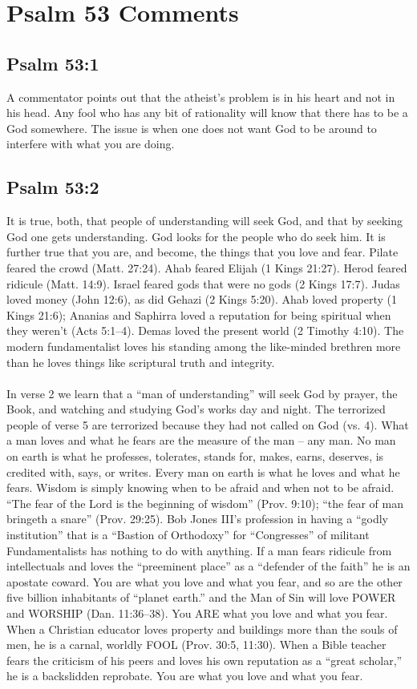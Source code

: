 \section{Psalm 53 Comments}

\subsection{Psalm 53:1}
A commentator points out that the atheist's problem is in his heart and not in his head. Any fool who has any bit of rationality will know that there has to be a God somewhere. The issue is when one does not want God to be around to interfere with what you are doing. \cite{Ruckman1992PsalmsV1}

\subsection{Psalm 53:2}
It is true, both, that people of understanding will seek God, and that by seeking God one gets understanding. God looks for the people who do seek him. It is further true that you are, and become, the things that you love and fear. Pilate feared the crowd (Matt. 27:24). Ahab feared Elijah (1 Kings 21:27). Herod feared ridicule (Matt. 14:9). Israel feared gods that were no gods (2 Kings 17:7). Judas loved money (John 12:6), as did Gehazi (2 Kings 5:20). Ahab loved property (1 Kings 21:6); Ananias and Saphirra loved a reputation for being spiritual when they weren't (Acts 5:1--4). Demas loved the present world (2 Timothy 4:10). The modern fundamentalist loves his standing among the like-minded brethren more than he loves things like scriptural truth and integrity. \cite{Ruckman1992PsalmsV1}\\
\\
\noindent In verse 2 we learn that a ``man of understanding'' will seek God by prayer, the Book, and watching and studying God’s works day and night. The terrorized people of verse 5 are terrorized because they had not called on God (vs. 4). What a man loves and what he fears are the measure of the man -- any man. No man on earth is what he professes, tolerates, stands for, makes, earns, deserves, is credited with, says, or writes. Every man on earth is what he loves and what he fears. Wisdom is simply knowing when to be afraid and when not to be afraid. ``The fear of the Lord is the beginning of wisdom'' (Prov. 9:10); ``the fear of man bringeth a snare'' (Prov. 29:25). Bob Jones III’s profession in having a ``godly institution'' that is a ``Bastion of Orthodoxy'' for ``Congresses'' of militant Fundamentalists has nothing to do with anything. If a man fears ridicule from intellectuals and loves the ``preeminent place'' as a ``defender of the faith'' he is an apostate coward. You are what you love and what you fear, and so are the other five billion inhabitants of “planet earth.”  and the Man of Sin will love POWER and WORSHIP (Dan. 11:36--38). You ARE what you love and what you fear. When a Christian educator loves property and buildings more than the souls of men, he is a carnal, worldly FOOL (Prov. 30:5, 11:30). When a Bible teacher fears the criticism of his peers and loves his own reputation as a ``great scholar,'' he is a backslidden reprobate. You are what you love and what you fear.\cite{Ruckman1992PsalmsV1}

